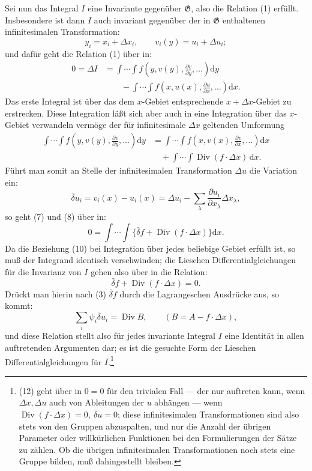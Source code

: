 \documentclass[11pt]{article}
\newcommand{\dd}{\mathrm d}
\newcommand{\Div}{\operatorname{Div}}
\newcommand{\G}{\mathfrak G}
\newcommand{\D}{\Delta}
\newcommand{\bd}{\bar{\delta}}
\newcommand{\p}{\partial}
\begin{document}
Sei nun das Integral \(I\) eine Invariante gegenüber \(\G\), also die Relation (1) erfüllt. Insbesondere ist dann \(I\) auch invariant gegenüber der in \(\G\) enthaltenen infinitesimalen Transformation:
\[
y_i=x_i+\D x_i,\qquad v_i(y)=u_i+\D u_i;
\]
und dafür geht die Relation (1) über in:
\begin{equation}
\begin{aligned}
0=\D I
&=\int\!\cdots\!\int f\!\left(y,v(y),\frac{\p v}{\p y},\ldots\right)\dd y\\
&\qquad-\int\!\cdots\!\int f\!\left(x,u(x),\frac{\p u}{\p x},\ldots\right)\dd x.
\end{aligned}
\tag{7}
\end{equation}
Das erste Integral ist über das dem \(x\)-Gebiet entsprechende \(x+\D x\)-Gebiet zu erstrecken. Diese Integration läßt sich aber auch in eine Integration über das \(x\)-Gebiet verwandeln vermöge der für infinitesimale \(\D x\) geltenden Umformung
\begin{equation}
\begin{aligned}
\int\!\cdots\!\int f\!\left(y,v(y),\frac{\p v}{\p y},\ldots\right)\dd y
&=\int\!\cdots\!\int f\!\left(x,v(x),\frac{\p v}{\p x},\ldots\right)\dd x\\
&\quad+\int\!\cdots\!\int \Div(f\cdot \D x)\,\dd x.
\end{aligned}
\tag{8}
\end{equation}
Führt man somit an Stelle der infinitesimalen Transformation \(\D u\) die Variation ein:
\begin{equation}
\bd u_i=v_i(x)-u_i(x)=\D u_i-\sum_\lambda\frac{\p u_i}{\p x_\lambda}\D x_\lambda,
\tag{9}
\end{equation}
so geht (7) und (8) über in:
\begin{equation}
0=\int\!\cdots\!\int\{\bd f+\Div(f\cdot\D x)\}\dd x.
\tag{10}
\end{equation}
Da die Beziehung (10) bei Integration über jedes beliebige Gebiet erfüllt ist, so muß der Integrand identisch verschwinden; die Lieschen Differentialgleichungen für die Invarianz von \(I\) gehen also über in die Relation:
\begin{equation}
\bd f+\Div(f\cdot\D x)=0.
\tag{11}
\end{equation}
Drückt man hierin nach (3) \(\bd f\) durch die Lagrangeschen Ausdrücke aus, so kommt:
\begin{equation}
\sum_i\psi_i\bd u_i=\Div B,\qquad (B=A-f\cdot\D x),
\tag{12}
\end{equation}
und diese Relation stellt also für jedes invariante Integral \(I\) eine Identität in allen auftretenden Argumenten dar; es ist die gesuchte Form der Lieschen Differentialgleichungen für \(I\).\footnote{(12) geht über in \(0=0\) für den trivialen Fall --- der nur auftreten kann, wenn \(\D x,\D u\) auch von Ableitungen der \(u\) abhängen --- wenn \(\Div(f\cdot\D x)=0,\ \bd u=0\); diese infinitesimalen Transformationen sind also stets von den Gruppen abzuspalten, und nur die Anzahl der übrigen Parameter oder willkürlichen Funktionen bei den Formulierungen der Sätze zu zählen. Ob die übrigen infinitesimalen Transformationen noch stets eine Gruppe bilden, muß dahingestellt bleiben.}
\end{document}
